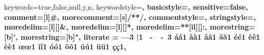 \expandafter\expandafter\expandafter\lstdefinelanguage
\expandafter{\language@yaml}
{
  keywords={true,false,null,y,n},
  keywordstyle=\color{darkgray}\bfseries,
  basicstyle=\YAMLkeystyle\small,                                 %
  sensitive=false,
  comment=[l]{\#},
  morecomment=[s]{/*}{*/},
  commentstyle=\color{purple}\ttfamily,
  stringstyle=\YAMLvaluestyle\ttfamily,
  moredelim=[l][\color{orange}]{\&},
  moredelim=[l][\color{magenta}]{*},
  moredelim=**[il][\YAMLcolonstyle{:}\YAMLvaluestyle]{:},   %
  morestring=[b]',
  morestring=[b]",
  literate =    {---}{{\ProcessThreeDashes}}3
                {|}{{\textcolor{red}\textbar}}1 
                {\ -\ }{{\mdseries\ -\ }}3
  {á}{{\'a}}1
  {à}{{\`a}}1
  {â}{{\^a}}1
  {ã}{{\~a}}1
  {é}{{\'e}}1
  {ê}{{\^e}}1
  {è}{{\`e}}1
  {œ}{{\oe{}}}1
  {í}{{\'i}}1
  {ó}{{\'o}}1
  {õ}{{\~o}}1
  {ú}{{\'u}}1
  {ü}{{\"u}}1
  {ç}{{\c{c}}}1,
}

\makeatother

\newcommand\ProcessThreeDashes{\llap{\color{cyan}\mdseries-{-}-}}
